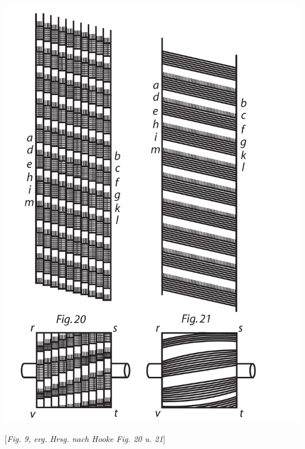 \begin{minipage}[t]{0.52\textwidth}
\vspace{-6mm}                
\includegraphics[width=1.0\textwidth]{images/LH0351506_014-dext20u22.pdf}\\
\rule[0pt]{0mm}{0pt}[\textit{Fig. 9, erg. Hrsg. nach Hooke Fig. 20 u. 21}]
\end{minipage}
